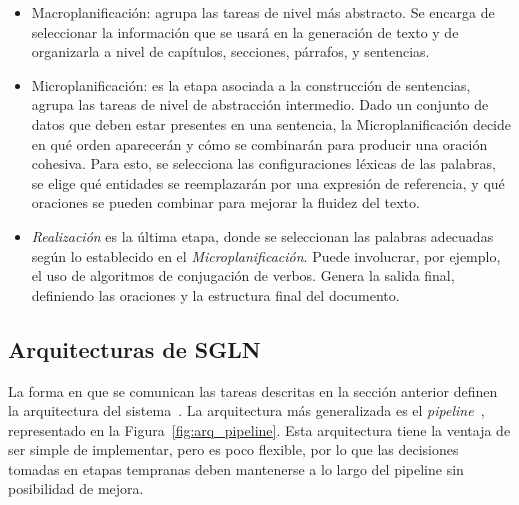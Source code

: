 \begin{itemize}
    \item Macroplanificación: agrupa las tareas de nivel más abstracto. Se encarga de seleccionar la información que se usará en la generación de texto y de organizarla a nivel de capítulos, secciones, párrafos, y sentencias.
    \item Microplanificación: es la etapa asociada a la construcción de sentencias, agrupa las tareas de nivel de abstracción intermedio. Dado un conjunto de datos que deben estar presentes en una sentencia, la Microplanificación decide en qué orden aparecerán y cómo se combinarán para producir una oración cohesiva. 
    Para esto, se selecciona las configuraciones léxicas de las palabras, se elige qué entidades se reemplazarán por una expresión de referencia, y qué oraciones se pueden combinar para mejorar la fluidez del texto.
    \item \emph{Realización} es la última etapa, donde se seleccionan las palabras adecuadas según lo establecido en el \emph{Microplanificación}. Puede involucrar, por ejemplo, el uso de algoritmos de conjugación de verbos. 
    Genera la salida final, definiendo las oraciones y la estructura final del documento.
\end{itemize}

\subsection{Arquitecturas de SGLN}
La forma en que se comunican las tareas descritas en la sección anterior definen la arquitectura del sistema~\cite{ibanez2004arquitectura}. La arquitectura más generalizada es el \emph{pipeline}~\cite{hervas2008descripcion}, representado en la Figura~\ref{fig:arq_pipeline}.
Esta arquitectura tiene la ventaja de ser simple de implementar, pero es poco flexible, por lo que las decisiones tomadas en etapas tempranas deben mantenerse a lo largo del pipeline sin posibilidad de mejora.

